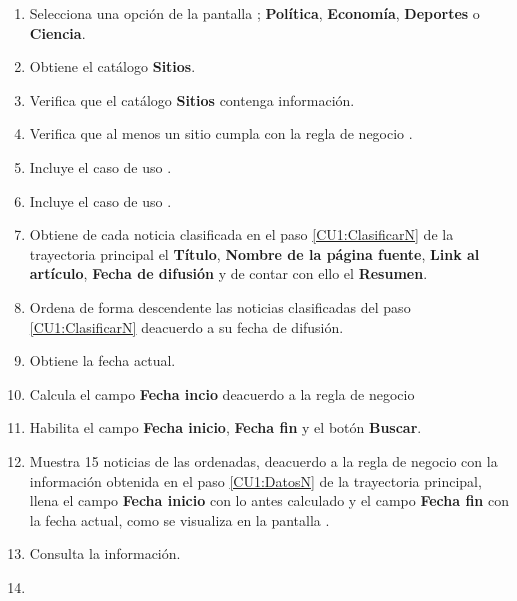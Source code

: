 \begin{enumerate}[1.]
	
	\item \actor Selecciona una opción de la pantalla ; \textbf{Política}, \textbf{Economía}, \textbf{Deportes} o \textbf{Ciencia}. 
	
	\item \sistema Obtiene el catálogo \textbf{Sitios}.
	
	\item \sistema Verifica que el catálogo \textbf{Sitios} contenga información. 
	
	\item \sistema Verifica que al menos un sitio cumpla con la regla de negocio . 
	
	\item \sistema Incluye el caso de uso .
	
	\item \sistema \label{CU1:ClasificarN}Incluye el caso de uso .

	\item \sistema \label{CU1:DatosN}Obtiene de cada noticia clasificada en el paso \ref{CU1:ClasificarN} de la trayectoria principal el \textbf{Título}, \textbf{Nombre de la página fuente}, \textbf{Link al artículo}, \textbf{Fecha de difusión} y de contar con ello el \textbf{Resumen}.

	\item \sistema \label{CU1:OrdenaN}Ordena de forma descendente las noticias clasificadas del paso \ref{CU1:ClasificarN} deacuerdo a su fecha de difusión.

	\item \sistema Obtiene la fecha actual.

	\item \sistema \label{CU1:FechaI}Calcula el campo \textbf{Fecha incio} deacuerdo a la regla de negocio 

	\item \sistema Habilita el campo \textbf{Fecha inicio}, \textbf{Fecha fin} y el botón \textbf{Buscar}.

	\item \sistema Muestra 15 noticias de las ordenadas, deacuerdo a la regla de negocio  con la información obtenida en el paso \ref{CU1:DatosN} de la trayectoria principal, llena el campo \textbf{Fecha inicio} con lo antes calculado y el campo \textbf{Fecha fin} con la fecha actual, como se visualiza en la pantalla .

	\item \actor \label{CU1:Consulta}Consulta la información.


	
	\item \finCU	
\end{enumerate}



